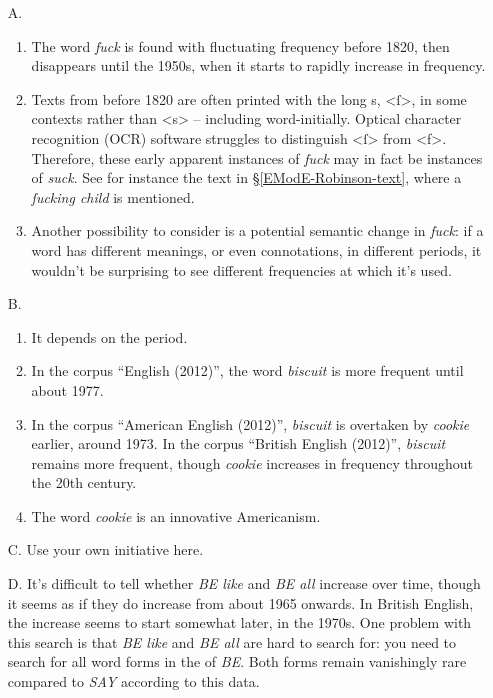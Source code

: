 \noindent\textbf{}
\begin{itemize}
    \item [A.]\begin{enumerate}
        \item The word \textit{fuck} is found with fluctuating frequency before 1820, then disappears until the 1950s, when it starts to rapidly increase in frequency.
        \item Texts from before 1820 are often printed with the long s, <ſ>, in some contexts rather than <s> -- including word-initially. Optical character recognition (OCR) software struggles to distinguish <ſ> from <f>. Therefore, these early apparent instances of \emph{fuck} may in fact be instances of \emph{suck}. See for instance the text in §\ref{EModE-Robinson-text}, where a \emph{ſucking child} is mentioned.
        \item Another possibility to consider is a potential semantic change in \textit{fuck}: if a word has different meanings, or even connotations, in different periods, it wouldn't be surprising to see different frequencies at which it's used.
    \end{enumerate}
    \item [B.]\begin{enumerate}
        \item It depends on the period.
        \item In the corpus ``English (2012)'', the word \emph{biscuit} is more frequent until about 1977.
        \item In the corpus ``American English (2012)'', \emph{biscuit} is overtaken by \emph{cookie} earlier, around 1973. In the corpus ``British English (2012)'', \emph{biscuit} remains more frequent, though \emph{cookie} increases in frequency throughout the 20th century.
        \item The word \emph{cookie} is an innovative Americanism.
    \end{enumerate}
    \item [C.] Use your own initiative here.
    \item [D.] It's difficult to tell whether \textit{BE like} and \textit{BE all} increase over time, though it seems as if they do increase from about 1965 onwards. In British English, the increase seems to start somewhat later, in the 1970s. One problem with this search is that \textit{BE like} and \textit{BE all} are hard to search for: you need to search for all word forms in the  of \emph{BE}. Both forms remain vanishingly rare compared to \emph{SAY} according to this data.  

\end{itemize}
